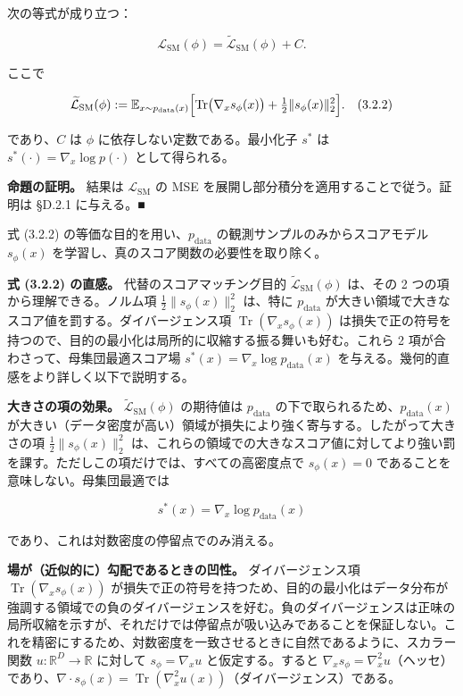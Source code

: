 \begin{propositionbox}
次の等式が成り立つ：

\[
\mathcal{L}_{\mathrm{SM}}(\phi) = \widetilde{\mathcal{L}}_{\mathrm{SM}}(\phi) + C.
\]

ここで

\[
\widetilde{\mathcal{L}}_{\mathrm{SM}}(\phi) := \mathbb{E}_{x\sim p_{\mathrm{data}}(x)}\Bigl[\operatorname{Tr}\bigl(\nabla_x s_\phi(x)\bigr) + \tfrac{1}{2}\|s_\phi(x)\|_2^2\Bigr].
\quad (3.2.2)
\]

であり、$C$ は $\phi$ に依存しない定数である。最小化子 $s^*$ は $s^*(\cdot)=\nabla_x\log p(\cdot)$ として得られる。
\end{propositionbox}


\textbf{命題の証明。} 結果は $\mathcal{L}_{\mathrm{SM}}$ の MSE を展開し部分積分を適用することで従う。証明は §D.2.1 に与える。■

式 (3.2.2) の等価な目的を用い、$p_{\mathrm{data}}$ の観測サンプルのみからスコアモデル $s_\phi(x)$ を学習し、真のスコア関数の必要性を取り除く。

\textbf{式 (3.2.2) の直感。} 代替のスコアマッチング目的 $\widetilde{\mathcal{L}}_{\mathrm{SM}}(\phi)$ は、その 2 つの項から理解できる。ノルム項 $\tfrac{1}{2}\|s_\phi(x)\|_2^2$ は、特に $p_{\mathrm{data}}$ が大きい領域で大きなスコア値を罰する。ダイバージェンス項 $\operatorname{Tr}(\nabla_x s_\phi(x))$ は損失で正の符号を持つので、目的の最小化は局所的に収縮する振る舞いも好む。これら 2 項が合わさって、母集団最適スコア場 $s^*(x)=\nabla_x\log p_{\mathrm{data}}(x)$ を与える。幾何的直感をより詳しく以下で説明する。

\textbf{大きさの項の効果。} $\widetilde{\mathcal{L}}_{\mathrm{SM}}(\phi)$ の期待値は $p_{\mathrm{data}}$ の下で取られるため、$p_{\mathrm{data}}(x)$ が大きい（データ密度が高い）領域が損失により強く寄与する。したがって大きさの項 $\tfrac{1}{2}\|s_\phi(x)\|_2^2$ は、これらの領域での大きなスコア値に対してより強い罰を課す。ただしこの項だけでは、すべての高密度点で $s_\phi(x)=0$ であることを意味しない。母集団最適では

\[
s^*(x) = \nabla_x \log p_{\mathrm{data}}(x)
\]


であり、これは対数密度の停留点でのみ消える。

\textbf{場が（近似的に）勾配であるときの凹性。} ダイバージェンス項 $\operatorname{Tr}(\nabla_x s_\phi(x))$ が損失で正の符号を持つため、目的の最小化はデータ分布が強調する領域での負のダイバージェンスを好む。負のダイバージェンスは正味の局所収縮を示すが、それだけでは停留点が吸い込みであることを保証しない。これを精密にするため、対数密度を一致させるときに自然であるように、スカラー関数 $u:\mathbb{R}^D\to\mathbb{R}$ に対して $s_\phi=\nabla_x u$ と仮定する。すると $\nabla_x s_\phi=\nabla_x^2 u$（ヘッセ）であり、$\nabla\cdot s_\phi(x)=\operatorname{Tr}(\nabla_x^2 u(x))$（ダイバージェンス）である。

